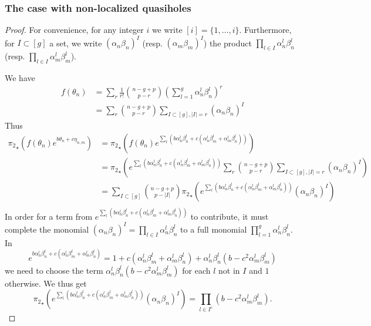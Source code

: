 \documentclass{article}
\theoremstyle{definition}
\begin{document}
\subsubsection{The case with non-localized quasiholes}

\mainqh*

\begin{proof}
For convenience, for any integer $i$ we write $[i]=\lbrace{1,\dots,i}\rbrace$. Furthermore, for $I\subset [g]$ a set, we write $(\alpha_n\beta_n)^I$ (resp. $(\alpha_m\beta_m)^I$) the product $\prod_{l\in I} \alpha_n^l \beta_n^l$ (resp. $\prod_{l\in I} \alpha_m^l \beta_m^l$).

We have 
\begin{align*}
f(\theta_n)&=\sum_r \frac{1}{r!}\binom{n-g+p}{p-r} \left( \sum_{l=1}^g  \alpha_n^l \beta_n^l\right)^r\\
&= \sum_r \binom{n-g+p}{p-r} \sum_{I \subset [g],|I|=r} \left(\alpha_n \beta_n\right)^I
\end{align*}
Thus
\begin{align*}
{\pi_2}_\star \left( f \left(\theta_n \right)  e^{ b \theta_n + c \eta_{n,m}} \right)&=
{\pi_2}_\star \left( f \left(\theta_n\right)  e^{\sum_l (b \alpha_n^l \beta_n^l + c (\alpha_n^l \beta_m^l + \alpha_m^l \beta_n^l))} \right)\\
&= {\pi_2}_\star \left(e^{\sum_l (b \alpha_n^l \beta_n^l + c (\alpha_n^l \beta_m^l + \alpha_m^l \beta_n^l))} \sum_r \binom{n-g+p}{p-r} \sum_{I \subset [g],|I|=r} \left(\alpha_n \beta_n\right)^I\right)\\
&=  \sum_{I\subset [g]} \binom{n-g+p}{p-|I|} {\pi_2}_\star \left(e^{\sum_l (b \alpha_n^l \beta_n^l + c (\alpha_n^l \beta_m^l + \alpha_m^l \beta_n^l))} \left(\alpha_n \beta_n\right)^I\right)\\
\end{align*}
In order for a term from $e^{\sum_l (b \alpha_n^l \beta_n^l + c (\alpha_n^l \beta_m^l + \alpha_m^l \beta_n^l))}$ to contribute, it must complete the monomial $\left(\alpha_n \beta_n\right)^I=\prod_{l\in I} \alpha_n^l \beta_n^l$ to a full monomial $\prod_{l=1}^g \alpha_n^l \beta_n^l$. In 
$$e^{b \alpha_n^l \beta_n^l + c (\alpha_n^l \beta_m^l + \alpha_m^l \beta_n^l)}=1+c(\alpha_n^l \beta_m^l + \alpha_m^l \beta_n^l) + \alpha_n^l \beta_n^l (b-c^2 \alpha_m^l \beta_m^l)$$ we need to choose the term $\alpha_n^l \beta_n^l (b-c^2 \alpha_m^l \beta_m^l)$ for each $l$ not in $I$ and $1$ otherwise.
We thus get $${\pi_2}_\star \left(e^{\sum_l (b \alpha_n^l \beta_n^l + c (\alpha_n^l \beta_m^l + \alpha_m^l \beta_n^l))} \left(\alpha_n \beta_n\right)^I\right)=\prod_{l\in I^c} (b-c^2 \alpha_m^l \beta_m^l).$$

\end{proof}
\end{document}
